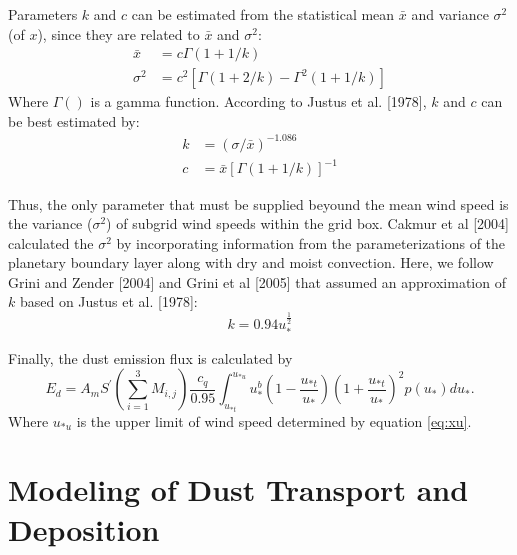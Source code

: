   Parameters $k$ and $c$ can be estimated from the statistical mean $\bar{x}$ and 
  variance $\sigma^2$ (of $x$), since they are related to $\bar{x}$ and $\sigma^2$: 
  \begin{align}
  \bar{x}  &= c \Gamma(1+1/k)  \\
  \sigma^2 &= c^2 \left[ \Gamma(1+2/k) - \Gamma^2(1+1/k) \right]  
  \end{align}
  Where $\Gamma()$ is a gamma function. According to Justus et al. [1978], $k$ and $c$ 
  can be best estimated by:
  \begin{align}
  k &= (\sigma/\bar{x})^{-1.086} \\
  c &= \bar{x} \left[ \Gamma(1+1/k) \right]^{-1}
  \end{align}
  
  Thus, the only parameter that must be supplied beyound the mean wind speed is the 
  variance ($\sigma^2$) of subgrid wind speeds within the grid box. Cakmur et al [2004] 
  calculated the $\sigma^2$ by incorporating information from the parameterizations of 
  the planetary boundary layer along with dry and moist convection. Here, we follow 
  Grini and Zender [2004] and Grini et al [2005] that assumed an approximation of $k$ 
  based on Justus et al. [1978]:
  \begin{equation}
  k = 0.94u_*^{\frac{1}{2}}
  \end{equation}

  Finally, the dust emission flux is calculated by
  \begin{equation}
  E_{d} = A_m S^\prime \left( \displaystyle{\sum_{i=1}^3 M_{i,j}} \right)
          \frac{c_q}{0.95} 
          \displaystyle \int_{u_{*t}}^{u_{*u}} 
          u_*^b\left(1-\frac{u_{*t}}{u_*}\right)
          \left(1+\frac{u_{*t}}{u_*}\right)^2 
          p(u_*) d u_* \mbox{.}
  \end{equation}  
  Where $u_{*u}$ is the upper limit of wind speed determined by equation \ref{eq:xu}.
  

\section{Modeling of Dust Transport and Deposition}

